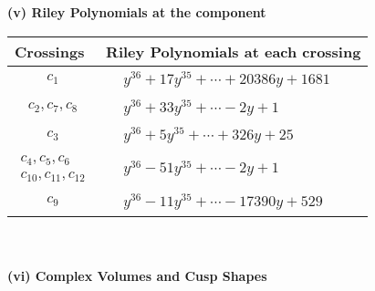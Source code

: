 \documentclass[1p]{elsarticle_modified}
\theoremstyle{definition}
\begin{document}
\newpage\renewcommand{\arraystretch}{1}
\flushleft \textbf{(v) Riley Polynomials at the component}\newline \\
\begin{tabular}{m{50pt}|m{274pt}}
Crossings & \hspace{64pt}Riley Polynomials at each crossing \\
\hline $$\begin{aligned}c_{1}\end{aligned}$$&$\begin{aligned}
&y^{36}+17 y^{35}+\cdots+20386 y+1681
\end{aligned}$\\
\hline $$\begin{aligned}c_{2},c_{7},c_{8}\end{aligned}$$&$\begin{aligned}
&y^{36}+33 y^{35}+\cdots-2 y+1
\end{aligned}$\\
\hline $$\begin{aligned}c_{3}\end{aligned}$$&$\begin{aligned}
&y^{36}+5 y^{35}+\cdots+326 y+25
\end{aligned}$\\
\hline $$\begin{aligned}c_{4},c_{5},c_{6}\\c_{10},c_{11},c_{12}\end{aligned}$$&$\begin{aligned}
&y^{36}-51 y^{35}+\cdots-2 y+1
\end{aligned}$\\
\hline $$\begin{aligned}c_{9}\end{aligned}$$&$\begin{aligned}
&y^{36}-11 y^{35}+\cdots-17390 y+529
\end{aligned}$\\
\hline
\end{tabular}\\~\\
\newpage\flushleft \textbf{(vi) Complex Volumes and Cusp Shapes}
\end{document}
